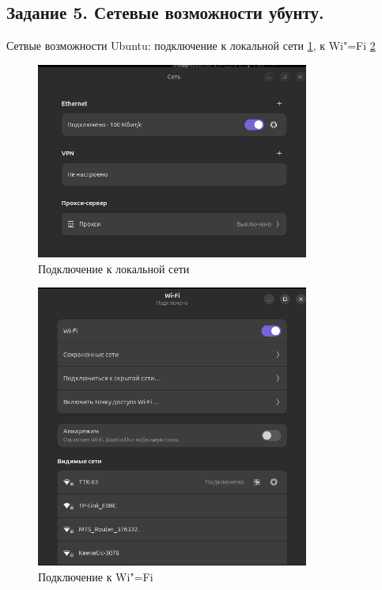\subsection{Задание 5. Сетевые возможности убунту.}


Сетвые возможности Ubuntu: подключение к локальной сети \ref{fig:conectToLocal}, к Wi"=Fi \ref{fig:conectToWiFi} %

\begin{figure}[!h]
    \centering
    \includegraphics[width = 0.8\textwidth]{images/conectToLocal.png}
    
    \caption{Подключение к локальной сети}
    
    \label{fig:conectToLocal}
\end{figure}

\begin{figure}[!h]
    \centering
    \includegraphics[width = 0.8\textwidth]{images/conectToWiFi.png}
    
    \caption{Подключение к Wi"=Fi}
    
    \label{fig:conectToWiFi}
\end{figure}

